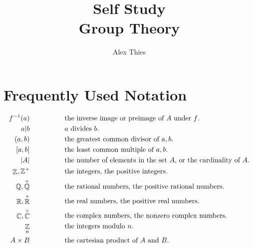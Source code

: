 \documentclass{amsbook}
\DeclareMathOperator{\Z}{\mathbb{Z}}
\DeclareMathOperator{\Zp}{\mathbb{Z}^{+}}
\DeclareMathOperator{\Q}{\mathbb{Q}}
\DeclareMathOperator{\R}{\mathbb{R}}
\DeclareMathOperator{\C}{\mathbb{C}}
\begin{document}
	\author{Alex Thies}
	\title{Self Study \\ Group Theory}

	\frontmatter

	\maketitle
	\newpage

	\tableofcontents
	\newpage

	\section*{Frequently Used Notation}
	\label{sec:frequently_used_notation}
	\begin{align*}
		f^{-1}(a)          & \hspace*{50pt} \text{the inverse image or preimage of $A$ under $f$.} \\
		a|b                & \hspace*{50pt} \text{$a$ divides $b$.} \\
		(a,b)              & \hspace*{50pt} \text{the greatest common divisor of $a,b$.} \\
		[a,b]              & \hspace*{50pt} \text{the least common multiple of $a,b$.} \\
		|A|                & \hspace*{50pt} \text{the number of elements in the set $A$, or the cardinality of $A$.} \\
		\Z,\Zp             & \hspace*{50pt} \text{the integers, the positive integers.} \\
		\Q,\Q^{+}          & \hspace*{50pt} \text{the rational numbers, the positive rational numbers.} \\
		\R,\R^{+}          & \hspace*{50pt} \text{the real numbers, the positive real numbers.} \\
		\C,\C^{\times}     & \hspace*{50pt} \text{the complex numbers, the nonzero complex numbers.} \\
		\Z_{n}             & \hspace*{50pt} \text{the integers modulo $n$.} \\
		A \times B         & \hspace*{50pt} \text{the cartesian product of $A$ and $B$.} \\

\end{align*}
\end{document}
